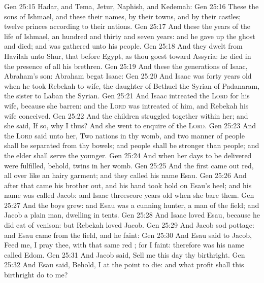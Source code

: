 \vs Gen 25:15 Hadar, and Tema, Jetur, Naphish, and Kedemah:
\vs Gen 25:16 These  the sons of Ishmael, and these  their names, by their towns, and by their castles; twelve princes according to their nations.
\vs Gen 25:17 And these  the years of the life of Ishmael, an hundred and thirty and seven years: and he gave up the ghost and died; and was gathered unto his people.
\vs Gen 25:18 And they dwelt from Havilah unto Shur, that  before Egypt, as thou goest toward Assyria:  he died in the presence of all his brethren.
\vs Gen 25:19 And these  the generations of Isaac, Abraham's son: Abraham begat Isaac:
\vs Gen 25:20 And Isaac was forty years old when he took Rebekah to wife, the daughter of Bethuel the Syrian of Padanaram, the sister to Laban the Syrian.
\vs Gen 25:21 And Isaac intreated the \textsc{Lord} for his wife, because she  barren: and the \textsc{Lord} was intreated of him, and Rebekah his wife conceived.
\vs Gen 25:22 And the children struggled together within her; and she said, If  so, why  I thus? And she went to enquire of the \textsc{Lord}.
\vs Gen 25:23 And the \textsc{Lord} said unto her, Two nations  in thy womb, and two manner of people shall be separated from thy bowels; and  people shall be stronger than  people; and the elder shall serve the younger.
\vs Gen 25:24 And when her days to be delivered were fulfilled, behold,  twins in her womb.
\vs Gen 25:25 And the first came out red, all over like an hairy garment; and they called his name Esau.
\vs Gen 25:26 And after that came his brother out, and his hand took hold on Esau's heel; and his name was called Jacob: and Isaac  threescore years old when she bare them.
\vs Gen 25:27 And the boys grew: and Esau was a cunning hunter, a man of the field; and Jacob  a plain man, dwelling in tents.
\vs Gen 25:28 And Isaac loved Esau, because he did eat of  venison: but Rebekah loved Jacob.
\vs Gen 25:29 And Jacob sod pottage: and Esau came from the field, and he  faint:
\vs Gen 25:30 And Esau said to Jacob, Feed me, I pray thee, with that same red ; for I  faint: therefore was his name called Edom.
\vs Gen 25:31 And Jacob said, Sell me this day thy birthright.
\vs Gen 25:32 And Esau said, Behold, I  at the point to die: and what profit shall this birthright do to me?
